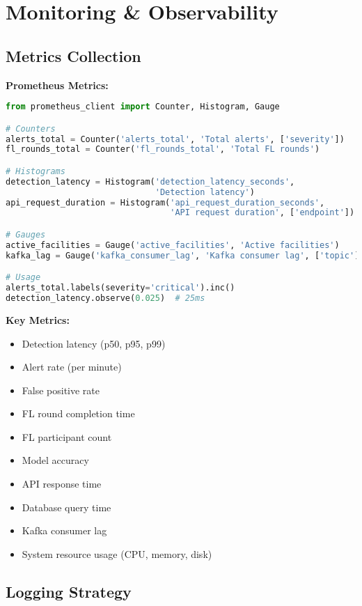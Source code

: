 \documentclass[12pt,a4paper]{article}
\begin{document}
\section{Monitoring \& Observability}

\subsection{Metrics Collection}

\textbf{Prometheus Metrics:}
\begin{lstlisting}[language=python]
from prometheus_client import Counter, Histogram, Gauge

# Counters
alerts_total = Counter('alerts_total', 'Total alerts', ['severity'])
fl_rounds_total = Counter('fl_rounds_total', 'Total FL rounds')

# Histograms
detection_latency = Histogram('detection_latency_seconds', 
                              'Detection latency')
api_request_duration = Histogram('api_request_duration_seconds',
                                 'API request duration', ['endpoint'])

# Gauges
active_facilities = Gauge('active_facilities', 'Active facilities')
kafka_lag = Gauge('kafka_consumer_lag', 'Kafka consumer lag', ['topic'])

# Usage
alerts_total.labels(severity='critical').inc()
detection_latency.observe(0.025)  # 25ms
\end{lstlisting}

\textbf{Key Metrics:}
\begin{itemize}[leftmargin=1cm,itemsep=0pt]
    \item Detection latency (p50, p95, p99)
    \item Alert rate (per minute)
    \item False positive rate
    \item FL round completion time
    \item FL participant count
    \item Model accuracy
    \item API response time
    \item Database query time
    \item Kafka consumer lag
    \item System resource usage (CPU, memory, disk)
\end{itemize}

\subsection{Logging Strategy}
\end{document}
